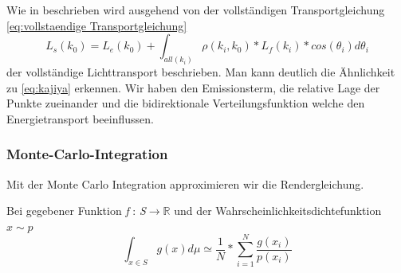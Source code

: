 Wie in \cite{marschner2009fundamentals} beschrieben wird ausgehend von der vollständigen Transportgleichung
\ref{eq:vollstaendige Transportgleichung}
\begin{equation}\label{eq:vollstaendige Transportgleichung}
    L_s(k_0) = L_e(k_0) + \int_{all(k_i)}^{} \rho(k_i, k_0)*L_f(k_i)*cos(\theta_i)d\theta_i
\end{equation}
der vollständige Lichttransport beschrieben. Man kann deutlich die Ähnlichkeit
zu \ref{eq:kajiya} erkennen. Wir haben den Emissionsterm, die relative Lage der 
Punkte zueinander und die bidirektionale Verteilungsfunktion welche den Energietransport
beeinflussen.


\subsubsection{Monte-Carlo-Integration}
Mit der Monte Carlo Integration approximieren wir die Rendergleichung.\par 
Bei gegebener Funktion \textit{f }:\textit{ S}$\rightarrow \mathbb{R}$ und der 
Wahrscheinlichkeitsdichtefunktion $x \sim p$
\cite{KK02}
\label{pic:MonteCarloIntegration}
\begin{equation}\label{eq:montcarlo}
    \int_{x\in S} g(x) d\mu \simeq \frac{1}{N}*\sum_{i=1}^{N}\frac{g(x_i)}{p(x_i)}
\end{equation}

